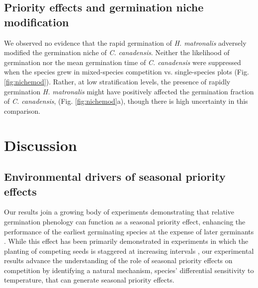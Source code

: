 \documentclass{article}[11pt]
\begin{document}
\subsection*{Priority effects and germination niche modification}
We observed no evidence that the rapid germination of \textit{H. matronalis} adversely modified the germination niche of \textit{C. canadensis}. Neither the likelihood of germination nor the mean germination time of \textit{C. canadensis} were suppressed when the species grew in mixed-species competition vs. single-species plots (Fig. \ref{fig:nichemod}). Rather, at low stratification levels, the presence of rapidly germination \textit{H. matronalis} might have positively affected the germination fraction of \textit{C. canadensis}, (Fig. \ref{fig:nichemod}a), though there is high uncertainty in this comparison.

\section*{Discussion}
\subsection*{Environmental drivers of seasonal priority effects}
Our results join a growing body of experiments demonstrating that relative germination phenology can function as a seasonal priority effect, enhancing the performance of the earliest germinating species at the expense of later germinants \citep{Korner2008,Dickson2012,Ross1972}. While this effect has been primarily demonstrated in experiments in which the planting of competing seeds is staggered at increasing intervals \citep{Young:2017aa,Weidlich:2020aa}, our experimental results advance the understanding of the role of seasonal priority effects on competition by identifying a natural mechanism, species' differential sensitivity to temperature, that can generate seasonal priority effects. 
\end{document}
